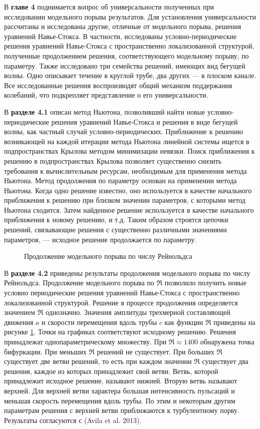 В \textbf{главе 4} поднимается вопрос об универсальности полученных при исследовании модельного порыва результатов. Для установления универсальности рассчитаны и исследованы другие, отличные от модельного порыва, решения уравнений Навье-Стокса. В частности, исследованы условно-периодические решения уравнений Навье-Стокса с пространственно локализованной структурой, полученные продолжением решения, соответствующего модельному порыву, по параметру. Также исследовано три семейства решений, имеющих вид бегущей волны. Одно описывает течение в круглой трубе, два других --- в плоском канале. Все исследованные решения воспроизводят общий механизм поддержания колебаний, что подкрепляет представление о его универсальности.

В \textbf{разделе 4.1} описан метод Ньютона, позволивший найти новые условно-периодические решения уравнений Навье-Стокса и решения в виде бегущей волны, как частный случай условно-периодических. Приближение к решению возникающей на каждой итерации метода Ньютона линейной системы ищется в подпространствах Крылова методом минимизации невязки. Поиск приближения к решению в подпространствах Крылова позволяет существенно снизить требования к вычислительным ресурсам, необходимым для применения метода Ньютона. Метод продолжения по параметру основан на применении метода Ньютона. Когда одно решение известно, оно используется в качестве начального приближения к решению при близком значении параметров, с которыми метод Ньютона сходится. Затем найденное решение используется в качестве начального приближения к новому решению, и т.д. Таким образом строятся цепочки решений, связывающие решения с существенно различными значениями параметров, --- исходное решение продолжается по параметру.

\begin{figure}
\caption{Продолжение модельного порыва по числу Рейнольдса}
\label{contin_pic}
\end{figure} 

В \textbf{разделе 4.2} приведены результаты продолжения модельного порыва по числу Рейнольдса. Продолжение модельного порыва по $\Re$ позволило получить новые условно периодические решения уравнений Навье-Стокса с пространственно локализованной структурой. Решение в процессе продолжения определяется значением $\Re$ однозначно. Значения амплитуды трехмерной составляющей движения $a$ и скорости перемещения вдоль трубы $c$ как функции $\Re$ приведены на рисунке \ref{contin_pic}. Точки на графиках соответствуют исходному решению. Решения принадлежат однопараметрическому множеству. При $\Re \approx 1400$ обнаружена точка бифуркации. При меньших $\Re$ решений не существует. При больших $\Re$ существует две ветви решений, то есть при каждом значении $\Re$ существует два решения, каждое из которых принадлежит свой ветви. Ветвь, которой принадлежит исходное решение, называют нижней. Вторую ветвь называют верхней. Для верхней ветви характера большая интенсивность пульсаций и меньшая скорость перемещения вдоль трубы. По этим и некоторым другим параметрам решения с верхней ветви приближаются к турбулентному порву. Результаты согласуются с (Avila et al. 2013). 

